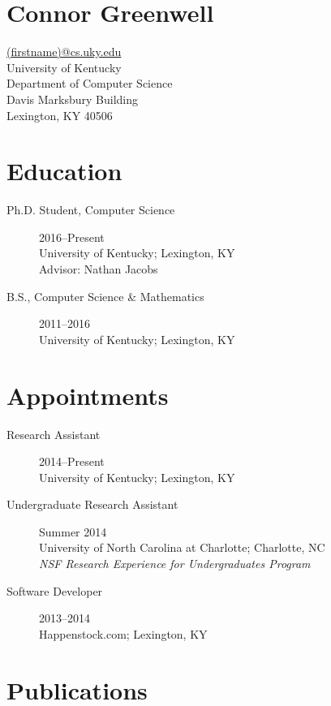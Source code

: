 \documentclass[12pt]{article}
\begin{document}
\section*{\bf\huge Connor Greenwell}
\href{mailto:(firstname)@cs.uky.edu}{(firstname)@cs.uky.edu} \\
University of Kentucky\\
Department of Computer Science\\
Davis Marksbury Building\\
Lexington, KY 40506

\section*{Education}

\begin{description}
    \item[Ph.D. Student, Computer Science] 2016--Present \\
        University of Kentucky; Lexington, KY \\
        Advisor: Nathan Jacobs
    \item[B.S., Computer Science \& Mathematics] 2011--2016 \\
        University of Kentucky; Lexington, KY
\end{description}

\section*{Appointments}

\begin{description}
    \item[Research Assistant] 2014--Present \\
        University of Kentucky; Lexington, KY
    \item[Undergraduate Research Assistant] Summer 2014 \\
        University of North Carolina at Charlotte; Charlotte, NC \\
        \emph{NSF Research Experience for Undergraduates Program}
    \item[Software Developer] 2013--2014 \\
        Happenstock.com; Lexington, KY
\end{description}

\section*{Publications}
\end{document}

